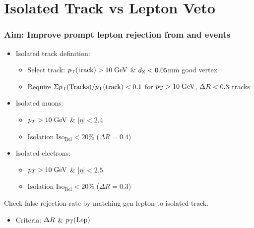 \documentclass{beamer}
\begin{document}
\section{Isolated Track vs Lepton Veto }
\begin{frame}
\frametitle{Aim: Improve prompt lepton rejection from  \ttbar and \wpj events}
 \begin{itemize}
  \item Isolated track definition:
  \begin{itemize}
  \item Select track: $p_{\text{T}}(\text{track})>10\;\text{Ge}\kern-0.06667em\text{V}$ \& $d_{\text{Z}}<0.05$mm good vertex
   \item Require $\Sigma p_{\text{T}}(\text{Tracks})/p_{\text{T}}(\text{track})<0.1$ for $p_{\text{T}}>10\;\text{Ge}\kern-0.06667em\text{V}$, $\Delta R<0.3$ tracks
  \end{itemize}
  \item Isolated muons:
  \begin{itemize}
   \item $p_{T}>10 \;\text{Ge}\kern-0.06667em\text{V}$ \& $|\eta|<2.4$
   \item  Isolation $\text{Iso}_{\text{Rel}}<20\%$ ($\Delta R=0.4$)
  \end{itemize}
    \item Isolated electrons:
  \begin{itemize}
   \item $p_{T}>10 \;\text{Ge}\kern-0.06667em\text{V}$ \& $|\eta|<2.5$
   \item  Isolation $\text{Iso}_{\text{Rel}}<20\%$ ($\Delta R=0.3$)
  \end{itemize}

 \end{itemize}
 Check false rejection rate by matching gen lepton to isolated track.
 \begin{itemize}
  \item Criteria: $\Delta R$ \& $p_{\text{T}}(\text{Lep})$
 \end{itemize}


\end{frame}



\end{document}
